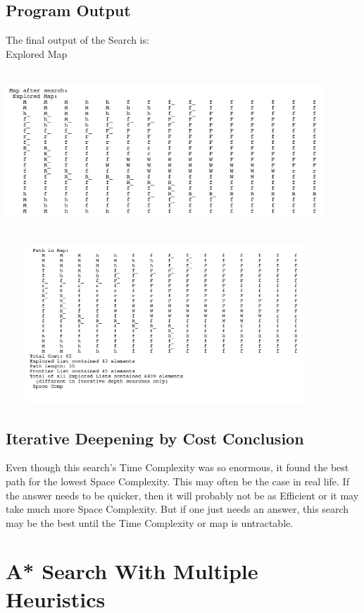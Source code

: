 \documentclass[12pt]{article}
\begin{document}
	\subsection{Program Output}
	The final output of the Search is:
	\\
	Explored Map
	\begin{center}
		\includegraphics[width=120mm,height=60mm]{images/icost/final_map_explored.png}
	\end{center}

	\begin{center}
		\includegraphics[width=120mm,height=60mm]{images/icost/final_map_path.png}
	\end{center}

	\subsection{Iterative Deepening by Cost Conclusion}
	Even though this search's Time Complexity was so enormous, it found the best path for the lowest Space Complexity. This may often be the case in real life. If the answer needs to be quicker, then it will probably not be as Efficient or it may take much more Space Complexity. But if one just needs an answer, this search may be the best until the Time Complexity or map is untractable.

\section{A* Search With Multiple Heuristics}
\end{document}
